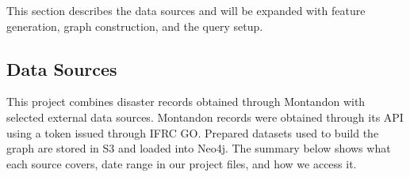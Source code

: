 \documentclass[11pt]{article}
\begin{document}
This section describes the data sources and will be expanded with feature generation,
graph construction, and the query setup.


\subsection{Data Sources}

This project combines disaster records obtained through Montandon with
selected external data sources. Montandon records were obtained through its
API using a token issued through IFRC GO. Prepared datasets used to build
the graph are stored in S3 and loaded into Neo4j. The summary below shows
what each source covers, date range in our project files, and how we access it.

\par\medskip
\begingroup
\footnotesize
\renewcommand{\arraystretch}{1.2}
\noindent
\end{document}
